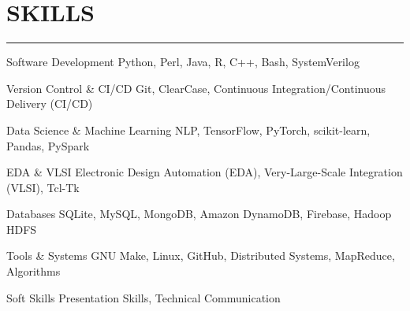 \documentclass[11pt]{article}
\begin{document}
\vspace*{0.01in}

\section*{\MakeUppercase{Skills}}
\hrule
\medskip

\begin{compactdesc}
    \item[Software Development] Python, Perl, Java, R, C++, Bash, SystemVerilog
    \item[Version Control \& CI/CD] Git, ClearCase, Continuous Integration/Continuous Delivery (CI/CD)
    \item[Data Science \& Machine Learning] NLP, TensorFlow, PyTorch, scikit-learn, Pandas, PySpark
    \item[EDA \& VLSI] Electronic Design Automation (EDA), Very-Large-Scale Integration (VLSI), Tcl-Tk
    \item[Databases] SQLite, MySQL, MongoDB, Amazon DynamoDB, Firebase, Hadoop HDFS
    \item[Tools \& Systems] GNU Make, Linux, GitHub, Distributed Systems, MapReduce, Algorithms
    \item[Soft Skills] Presentation Skills, Technical Communication

\end{compactdesc}
\end{document}
